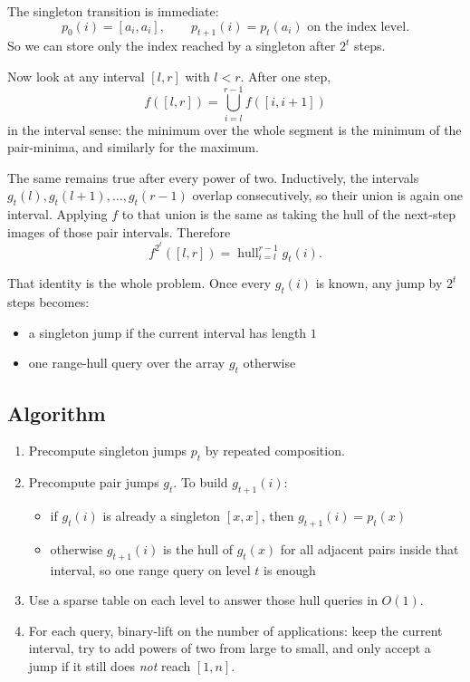 The singleton transition is immediate:
\[
p_0(i) = [a_i,a_i], \qquad p_{t+1}(i) = p_t(a_i) \text{ on the index level}.
\]
So we can store only the index reached by a singleton after \(2^t\) steps.

Now look at any interval \([l,r]\) with \(l < r\). After one step,
\[
f([l,r]) = \bigcup_{i=l}^{r-1} f([i,i+1])
\]
in the interval sense: the minimum over the whole segment is the minimum of the pair-minima, and similarly for the maximum.

The same remains true after every power of two. Inductively, the intervals \(g_t(l), g_t(l+1), \dots, g_t(r-1)\) overlap consecutively, so their union is again one interval. Applying \(f\) to that union is the same as taking the hull of the next-step images of those pair intervals. Therefore
\[
f^{2^t}([l,r]) = \operatorname{hull}_{i=l}^{r-1} g_t(i).
\]

That identity is the whole problem. Once every \(g_t(i)\) is known, any jump by \(2^t\) steps becomes:
\begin{itemize}
\item a singleton jump if the current interval has length \(1\)
\item one range-hull query over the array \(g_t\) otherwise
\end{itemize}

\subsection{Algorithm}
\begin{enumerate}
\item Precompute singleton jumps \(p_t\) by repeated composition.
\item Precompute pair jumps \(g_t\).
  To build \(g_{t+1}(i)\):
  \begin{itemize}
  \item if \(g_t(i)\) is already a singleton \([x,x]\), then \(g_{t+1}(i) = p_t(x)\)
  \item otherwise \(g_{t+1}(i)\) is the hull of \(g_t(x)\) for all adjacent pairs inside that interval, so one range query on level \(t\) is enough
  \end{itemize}
\item Use a sparse table on each level to answer those hull queries in \(O(1)\).
\item For each query, binary-lift on the number of applications:
  keep the current interval, try to add powers of two from large to small, and only accept a jump if it still does \emph{not} reach \([1,n]\).
\end{enumerate}

